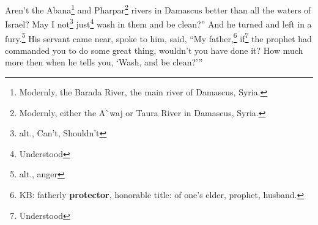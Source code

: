 \begin{inparaenum}
     Aren't the Abana\footnote{Modernly, the Barada River, the main river of Damascus, Syria.} and Pharpar\footnote{Modernly, either the A\`{}waj or Taura River in Damascus, Syria.} rivers in Damascus better than all the waters of Israel? May I not\footnote{alt., Can't, Shouldn't} just\footnote{Understood} wash in them and be clean?'' And he turned and left in a fury.\footnote{alt., anger}%
     His servant came near, spoke to him, said, ``My father,\footnote{KB: fatherly \textbf{protector}, honorable title: of one's elder, prophet, husband.} if\footnote{Understood} the prophet had commanded you to do some great thing, wouldn't you have done it? How much more then when he tells you, `Wash, and be clean?'\thinspace''%
\end{inparaenum}
